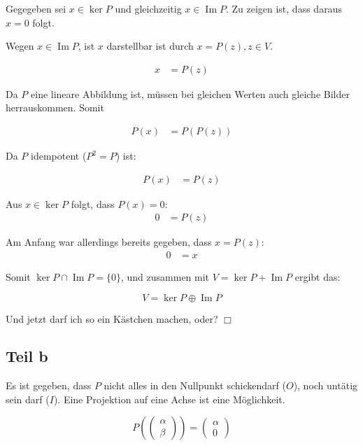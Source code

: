 \documentclass[a4paper,german,12pt,smallheadings]{scrartcl}
\begin{document}
Gegegeben sei $x \in \ker P$ und gleichzeitig $x \in \operatorname{Im} P$. Zu
zeigen ist, dass daraus $x = 0$ folgt.

Wegen $x \in \operatorname{Im} P$, ist $x$ darstellbar ist durch $x =
P(z), z \in V$.

\begin{align*}
  x &= P(z)
\end{align*}

Da $P$ eine lineare Abbildung ist, müssen bei gleichen Werten auch gleiche
Bilder herrauskommen. Somit

\begin{align*}
  P(x) &= P(P(z))
\end{align*}

Da $P$ idempotent ($P^2 = P$) ist:

\begin{align*}
  P(x) &= P(z)
\end{align*}

Aus $x \in \ker P$ folgt, dass $P(x) = 0$:
\begin{align*}
  0 &= P(z)
\end{align*}

Am Anfang war allerdings bereits gegeben, dass $x = P(z)$:
\begin{align*}
  0 &= x
\end{align*}

Somit $\ker P \cap \operatorname{Im} P = \{0\}$, und zusammen mit $V = \ker P +
\operatorname{Im} P$ ergibt das:

\begin{equation}
  V = \ker P \oplus \operatorname{Im} P
\end{equation}

Und jetzt darf ich so ein Kästchen machen, oder? $\Box$

\subsection*{Teil b}

Es ist gegeben, dass $P$ nicht alles in den Nullpunkt schickendarf ($O$), noch
untätig sein darf ($I$). Eine Projektion auf eine Achse ist eine Möglichkeit.

\begin{equation} 
  P\left(\begin{pmatrix} \alpha \\ \beta \end{pmatrix}\right) =
    \begin{pmatrix}\alpha \\ 0\end{pmatrix}
\end{equation}
\end{document}
